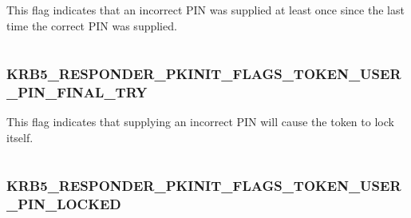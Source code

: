 \documentclass[letterpaper,10pt,english]{sphinxmanual}
\begin{document}
This flag indicates that an incorrect PIN was supplied at least once since the last time the correct PIN was supplied.

\begin{tabulary}{\linewidth}{|L|L|}
\hline

 & 
\\
\hline\end{tabulary}



\subsubsection{KRB5\_RESPONDER\_PKINIT\_FLAGS\_TOKEN\_USER\_PIN\_FINAL\_TRY}
\label{appdev/refs/macros/KRB5_RESPONDER_PKINIT_FLAGS_TOKEN_USER_PIN_FINAL_TRY:krb5-responder-pkinit-flags-token-user-pin-final-try}\label{appdev/refs/macros/KRB5_RESPONDER_PKINIT_FLAGS_TOKEN_USER_PIN_FINAL_TRY::doc}\label{appdev/refs/macros/KRB5_RESPONDER_PKINIT_FLAGS_TOKEN_USER_PIN_FINAL_TRY:krb5-responder-pkinit-flags-token-user-pin-final-try-data}

\begin{fulllineitems}
\label{appdev/refs/macros/KRB5_RESPONDER_PKINIT_FLAGS_TOKEN_USER_PIN_FINAL_TRY:KRB5_RESPONDER_PKINIT_FLAGS_TOKEN_USER_PIN_FINAL_TRY}
\end{fulllineitems}


This flag indicates that supplying an incorrect PIN will cause the token to lock itself.

\begin{tabulary}{\linewidth}{|L|L|}
\hline

 & 
\\
\hline\end{tabulary}



\subsubsection{KRB5\_RESPONDER\_PKINIT\_FLAGS\_TOKEN\_USER\_PIN\_LOCKED}
\label{appdev/refs/macros/KRB5_RESPONDER_PKINIT_FLAGS_TOKEN_USER_PIN_LOCKED::doc}\label{appdev/refs/macros/KRB5_RESPONDER_PKINIT_FLAGS_TOKEN_USER_PIN_LOCKED:krb5-responder-pkinit-flags-token-user-pin-locked}\label{appdev/refs/macros/KRB5_RESPONDER_PKINIT_FLAGS_TOKEN_USER_PIN_LOCKED:krb5-responder-pkinit-flags-token-user-pin-locked-data}
\end{document}
